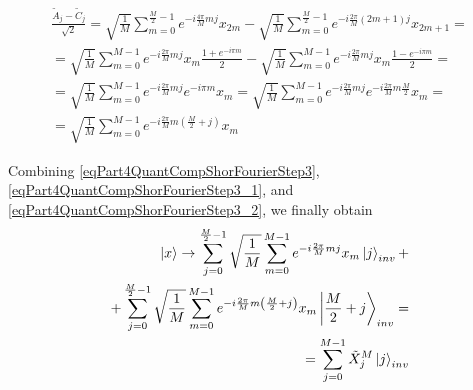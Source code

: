 \begin{eqnarray}
\frac{\tilde{A}_{j} - \tilde{C}_{j} }{\sqrt{2}} = 
\sqrt{\frac{1}{M}} 
\sum_{m = 0}^{\frac{M}{2} - 1} e^{-i \frac{4 \pi}{M} m j} x_{2m}  -
\sqrt{\frac{1}{M}} 
\sum_{m = 0}^{\frac{M}{2} - 1} 
e^{-i \frac{2 \pi}{M} \left(2m+1\right) j} x_{2m+1}
= 
\nonumber \\
=
\sqrt{\frac{1}{M}} \sum_{m = 0}^{M - 1}
e^{-i \frac{2 \pi}{M} m j} x_{m} \frac{1 + e^{-i \pi m}}{2}
-
\sqrt{\frac{1}{M}} \sum_{m = 0}^{M - 1}
e^{-i \frac{2 \pi}{M} m j} x_{m} \frac{1 - e^{-i \pi m}}{2} 
=
\nonumber \\
=
\sqrt{\frac{1}{M}} \sum_{m = 0}^{M - 1}
e^{-i \frac{2 \pi}{M} m j} e^{-i \pi m } x_{m} 
=
\sqrt{\frac{1}{M}} \sum_{m = 0}^{M - 1}
e^{-i \frac{2 \pi}{M} m j} e^{-i \frac{2 \pi}{M} m \frac{M}{2} } x_{m} 
=
\nonumber \\
=
\sqrt{\frac{1}{M}} \sum_{m = 0}^{M - 1}
e^{-i \frac{2 \pi}{M} m \left(\frac{M}{2} + j\right)} x_{m}
\label{eqPart4QuantCompShorFourierStep3_2}
\end{eqnarray}

Combining \eqref{eqPart4QuantCompShorFourierStep3}, 
\eqref{eqPart4QuantCompShorFourierStep3_1}, and
\eqref{eqPart4QuantCompShorFourierStep3_2}, we finally obtain 
\begin{eqnarray}
\ket{x} \rightarrow
\sum_{j = 0}^{\frac{M}{2} - 1} \sqrt{\frac{1}{M}} \sum_{m = 0}^{M - 1}
e^{-i \frac{2 \pi}{M} m j} x_{m} \ket{j}_{inv} +
\nonumber \\
+
\sum_{j = 0}^{\frac{M}{2} - 1} \sqrt{\frac{1}{M}} \sum_{m = 0}^{M - 1}
e^{-i \frac{2 \pi}{M} m \left(\frac{M}{2} + j\right)} x_{m} 
\left|\frac{M}{2} + j\right>_{inv} =
\nonumber \\
= \sum_{j = 0}^{M - 1} \tilde{X}_j^{M} \ket{j}_{inv}
\nonumber
\end{eqnarray}